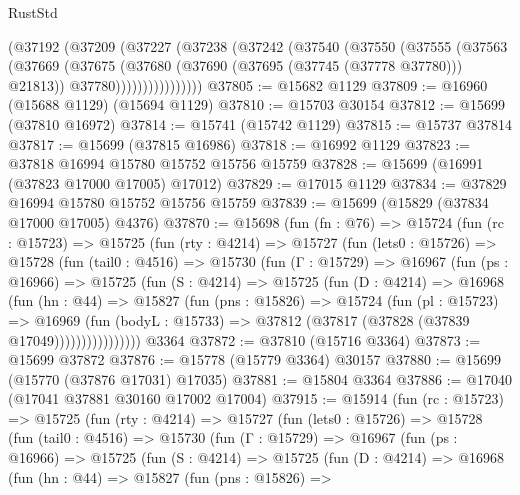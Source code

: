 \begin{lexlean}{RustStd}
\begin{coremodule}
              (@37192
                (@37209
                  (@37227
                    (@37238
                      (@37242
                        (@37540
                          (@37550
                            (@37555
                              (@37563
                                (@37669
                                  (@37675
                                    (@37680 (@37690 (@37695 (@37745 (@37778 @37780))) @21813))
                                    @37780))))))))))))))))
@37805 := @15682 @1129
@37809 := @16960 (@15688 @1129) (@15694 @1129)
@37810 := @15703 @30154
@37812 := @15699 (@37810 @16972)
@37814 := @15741 (@15742 @1129)
@37815 := @15737 @37814
@37817 := @15699 (@37815 @16986)
@37818 := @16992 @1129
@37823 := @37818 @16994 @15780 @15752 @15756 @15759
@37828 := @15699 (@16991 (@37823 @17000 @17005) @17012)
@37829 := @17015 @1129
@37834 := @37829 @16994 @15780 @15752 @15756 @15759
@37839 := @15699 (@15829 (@37834 @17000 @17005) @4376)
@37870 := @15698
    (fun (fn : @76) =>
    @15724
      (fun (rc : @15723) =>
      @15725
        (fun (rty : @4214) =>
        @15727
          (fun (lets0 : @15726) =>
          @15728
            (fun (tail0 : @4516) =>
            @15730
              (fun (Γ : @15729) =>
              @16967
                (fun (ps : @16966) =>
                @15725
                  (fun (S : @4214) =>
                  @15725
                    (fun (D : @4214) =>
                    @16968
                      (fun (hn : @44) =>
                      @15827
                        (fun (pns : @15826) =>
                        @15724
                          (fun (pl : @15723) =>
                          @16969
                            (fun (bodyL : @15733) =>
                            @37812 (@37817 (@37828 (@37839 @17049))))))))))))))))
    @3364
@37872 := @37810 (@15716 @3364)
@37873 := @15699 @37872
@37876 := @15778 (@15779 @3364) @30157
@37880 := @15699 (@15770 (@37876 @17031) @17035)
@37881 := @15804 @3364
@37886 := @17040 (@17041 @37881 @30160 @17002 @17004)
@37915 := @15914
    (fun (rc : @15723) =>
    @15725
      (fun (rty : @4214) =>
      @15727
        (fun (lets0 : @15726) =>
        @15728
          (fun (tail0 : @4516) =>
          @15730
            (fun (Γ : @15729) =>
            @16967
              (fun (ps : @16966) =>
              @15725
                (fun (S : @4214) =>
                @15725
                  (fun (D : @4214) =>
                  @16968
                    (fun (hn : @44) =>
                    @15827
                      (fun (pns : @15826) =>

\end{coremodule}
\end{lexlean}
